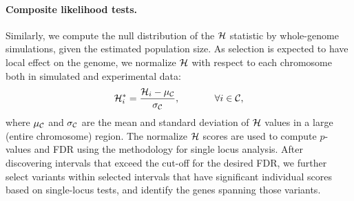 \paragraph{Composite likelihood tests.}
Similarly, we compute the null distribution of the ${\cal H}$ statistic by 
whole-genome simulations, given the estimated population size.
As selection is expected to have local effect on the genome, we
normalize ${\cal H}$ with respect to each chromosome both in simulated and
experimental data:
\begin{equation} {\cal H}_i^*=\frac{{\cal H}_i-\mu_{\cal C}}{\sigma_{\cal C}},
\hspace{0.5in} \forall i \in {\cal C},
\end{equation} 
where $\mu_{\cal C}$ and $\sigma_{\cal C}$ are the mean and standard deviation
of ${\cal H}$ values in a large (entire chromosome) region. The normalize
${\cal H}$ scores are used to compute $p$-values and FDR using the
methodology for single locus analysis. After discovering intervals
that exceed the cut-off for the desired FDR, we further select
variants within selected intervals that have significant individual
scores based on single-locus tests, and identify the genes spanning
those variants.

